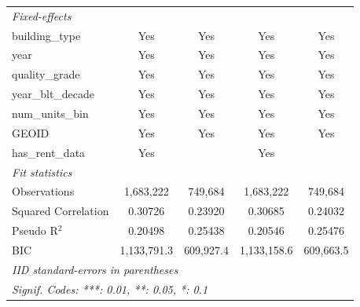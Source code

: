 \documentclass[
  11pt,
]{article}
\begin{document}
\begin{center}
{\begin{tabular}{lcccc}
   \midrule
   \emph{Fixed-effects}\\
   building\_type                            & Yes            & Yes            & Yes            & Yes\\  
   year                                      & Yes            & Yes            & Yes            & Yes\\  
   quality\_grade                            & Yes            & Yes            & Yes            & Yes\\  
   year\_blt\_decade                         & Yes            & Yes            & Yes            & Yes\\  
   num\_units\_bin                           & Yes            & Yes            & Yes            & Yes\\  
   GEOID                                     & Yes            & Yes            & Yes            & Yes\\  
   has\_rent\_data                           & Yes            &                & Yes            & \\  
   \midrule
   \emph{Fit statistics}\\
   Observations                              & 1,683,222      & 749,684        & 1,683,222      & 749,684\\  
   Squared Correlation                       & 0.30726        & 0.23920        & 0.30685        & 0.24032\\  
   Pseudo R$^2$                              & 0.20498        & 0.25438        & 0.20546        & 0.25476\\  
   BIC                                       & 1,133,791.3    & 609,927.4      & 1,133,158.6    & 609,663.5\\  
   \midrule \midrule
   \multicolumn{5}{l}{\emph{IID standard-errors in parentheses}}\\
   \multicolumn{5}{l}{\emph{Signif. Codes: ***: 0.01, **: 0.05, *: 0.1}}\\
\end{tabular}
}
\end{center}
\end{document}
